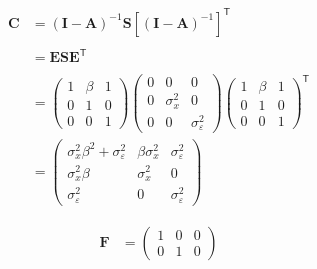 \documentclass[
]{book}
\theoremstyle{definition}
\theoremstyle{definition}
\theoremstyle{definition}
\theoremstyle{remark}
\begin{document}
\begin{align*}\mathbf{C} &=\left( \mathbf{I} - \mathbf{A} \right)^{-1} \mathbf{S} \left[ \left( \mathbf{I} - \mathbf{A} \right)^{-1} \right]^{\mathsf{T}} \\\\ &=\mathbf{E} \mathbf{S} \mathbf{E}^{\mathsf{T}} \\\\ &=\left( \begin{array}{ccc} 1 & \beta  & 1 \\ 0 & 1 & 0 \\ 0 & 0 & 1 \end{array} \right)\left( \begin{array}{ccc} 0 & 0 & 0 \\ 0 & \sigma  _{x} ^{2} & 0 \\ 0 & 0 & \sigma  _{\varepsilon } ^{2} \end{array} \right)\left( \begin{array}{ccc} 1 & \beta  & 1 \\ 0 & 1 & 0 \\ 0 & 0 & 1 \end{array} \right)^{\mathsf{T}}\\ &=\left( \begin{array}{ccc} \sigma  _{x} ^{2} \beta  ^{2} + \sigma  _{\varepsilon } ^{2} & \beta  \sigma  _{x} ^{2} & \sigma  _{\varepsilon } ^{2} \\ \sigma  _{x} ^{2} \beta  & \sigma  _{x} ^{2} & 0 \\ \sigma  _{\varepsilon } ^{2} & 0 & \sigma  _{\varepsilon } ^{2} \end{array} \right)\end{align*}

\begin{align*}\mathbf{F} &=\left( \begin{array}{ccc} 1 & 0 & 0 \\ 0 & 1 & 0 \end{array} \right)\end{align*}
\end{document}
